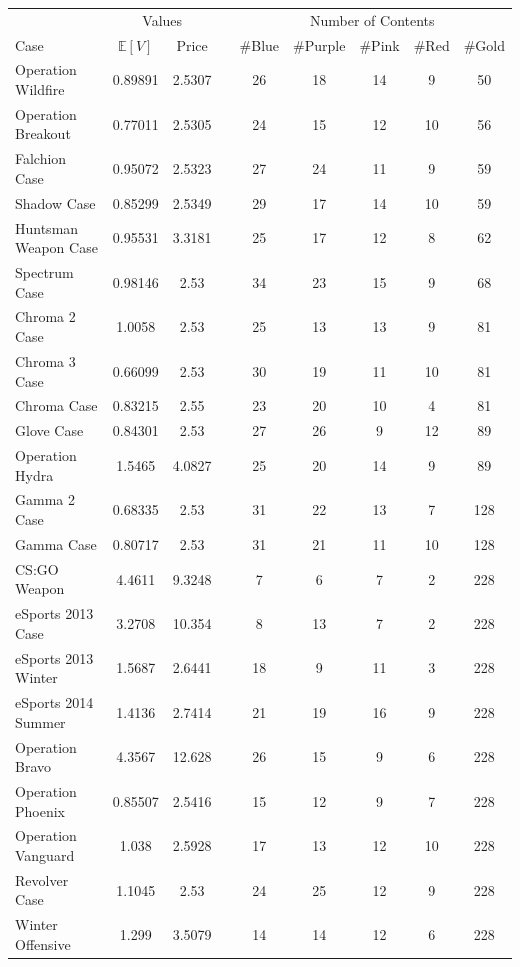 \documentclass[12pt]{paper}
\begin{document}
\begin{minipage}{\linewidth}
  \centering
  \begin{tabular}{@{}lcccccccc@{}}\toprule
    & \multicolumn{2}{c}{Values} & &\multicolumn{5}{c}{Number of Contents}\\
    \cmidrule{2-3} \cmidrule{5-9}
  Case & $\mathbb{E}[V]$ & Price &\quad& \#Blue & \#Purple & \#Pink & \#Red & \#Gold\\\midrule
Operation Wildfire  & 0.89891 & 2.5307 &\quad& 26 & 18 & 14 & 9 & 50\\
Operation Breakout  & 0.77011 & 2.5305 &\quad& 24 & 15 & 12 & 10 & 56\\
Falchion Case  & 0.95072 & 2.5323 &\quad& 27 & 24 & 11 & 9 & 59\\
Shadow Case  & 0.85299 & 2.5349 &\quad& 29 & 17 & 14 & 10 & 59\\
Huntsman Weapon Case  & 0.95531 & 3.3181 &\quad& 25 & 17 & 12 & 8 & 62\\
Spectrum Case  & 0.98146 & 2.53 &\quad& 34 & 23 & 15 & 9 & 68\\
Chroma 2 Case  & 1.0058 & 2.53 &\quad& 25 & 13 & 13 & 9 & 81\\
Chroma 3 Case  & 0.66099 & 2.53 &\quad& 30 & 19 & 11 & 10 & 81\\
Chroma Case  & 0.83215 & 2.55 &\quad& 23 & 20 & 10 & 4 & 81\\
Glove Case  & 0.84301 & 2.53 &\quad& 27 & 26 & 9 & 12 & 89\\
Operation Hydra  & 1.5465 & 4.0827 &\quad& 25 & 20 & 14 & 9 & 89\\
Gamma 2 Case  & 0.68335 & 2.53 &\quad& 31 & 22 & 13 & 7 & 128\\
Gamma Case & 0.80717 & 2.53 &\quad& 31 & 21 & 11 & 10 & 128\\\hline
CS:GO Weapon  & 4.4611 & 9.3248 &\quad& 7 & 6 & 7 & 2 & 228\\
eSports 2013 Case  & 3.2708 & 10.354 &\quad& 8 & 13 & 7 & 2 & 228\\
eSports 2013 Winter  & 1.5687 & 2.6441 &\quad& 18 & 9 & 11 & 3 & 228\\
eSports 2014 Summer  & 1.4136 & 2.7414 &\quad& 21 & 19 & 16 & 9 & 228\\
Operation Bravo  & 4.3567 & 12.628 &\quad& 26 & 15 & 9 & 6 & 228\\
Operation Phoenix  & 0.85507 & 2.5416 &\quad& 15 & 12 & 9 & 7 & 228\\
Operation Vanguard  & 1.038 & 2.5928 &\quad& 17 & 13 & 12 & 10 & 228\\
Revolver Case  & 1.1045 & 2.53 &\quad& 24 & 25 & 12 & 9 & 228\\
Winter Offensive  & 1.299 & 3.5079 &\quad& 14 & 14 & 12 & 6 & 228\\\bottomrule
  \end{tabular}
  
\end{minipage}
\end{document}
